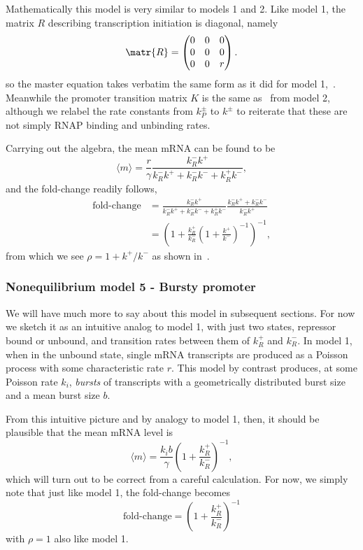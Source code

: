 Mathematically this model is very similar to models 1 and 2. Like model 1, the
matrix $R$ describing transcription initiation is diagonal, namely
\begin{equation}
\matr{R} = \begin{pmatrix}
                0 & 0 & 0 \\ 0 & 0 & 0 \\ 0 & 0 & r
        \end{pmatrix}.
\end{equation}
so the master equation takes verbatim the same form as it did for model
1,~. Meanwhile the promoter transition matrix $K$ is the
same as~ from model 2, although we relabel the
rate constants from $k_P^\pm$ to $k^\pm$ to reiterate that these are not simply
RNAP binding and unbinding rates.

Carrying out the algebra, the mean mRNA can be found to be
\begin{equation}
\langle m\rangle = \frac{r}{\gamma}
\frac{k_R^- k^+}
{k_R^- k^+ + k_R^- k^- + k_R^+ k^-},
\end{equation}
and the fold-change readily follows,
\begin{align}
\text{fold-change}
&=      \frac{k_R^- k^+}{k_R^- k^+ + k_R^- k^- + k_R^+ k^-}
        \frac{k_R^- k^+ + k_R^- k^-}{k_R^- k^+}
\\
&=      \left(1 + \frac{k_R^+}{k_R^-}
                \left(1 + \frac{k^+}{k^-}\right)^{-1}
        \right)^{-1},
\end{align}
from which we see $\rho = 1 + k^+/k^-$ as shown in~.

\subsubsection{Nonequilibrium model 5 - Bursty promoter}
We will have much more to say about this model in subsequent sections. For now
we sketch it as an intuitive analog to model 1, with just two states, repressor
bound or unbound, and transition rates between them of $k_R^+$ and $k_R^-$. In
model 1, when in the unbound state, single mRNA transcripts are produced as a
Poisson process with some characteristic rate $r$. This model by contrast
produces, at some Poisson rate $k_i$, \textit{bursts} of transcripts with a
geometrically distributed burst size and a mean burst size $b$.

From this intuitive picture and by analogy to model 1, then, it should be
plausible that the mean mRNA level is
\begin{equation}
\langle m\rangle = \frac{k_i b}{\gamma}
        \left(1 + \frac{k_R^+}{k_R^-}\right)^{-1},
\end{equation}
which will turn out to be correct from a careful calculation. For now, we simply
note that just like model 1, the fold-change becomes
\begin{equation}
\text{fold-change} = \left(1 + \frac{k_R^+}{k_R^-}\right)^{-1}
\end{equation}
with $\rho=1$ also like model 1.

